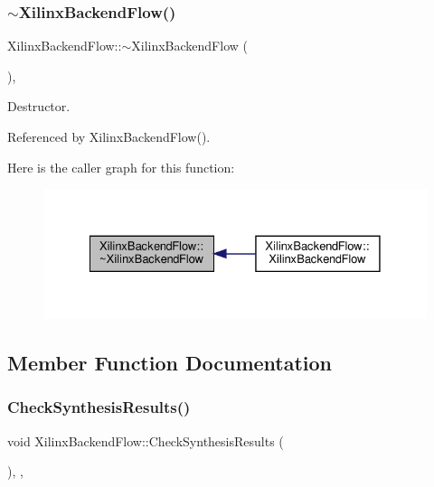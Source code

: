 \subsubsection{\texorpdfstring{$\sim$\+Xilinx\+Backend\+Flow()}{~XilinxBackendFlow()}}
{\footnotesize\ttfamily Xilinx\+Backend\+Flow\+::$\sim$\+Xilinx\+Backend\+Flow (\begin{DoxyParamCaption}{ }\end{DoxyParamCaption})\hspace{0.3cm}{\ttfamily [override]}, {\ttfamily [default]}}



Destructor. 



Referenced by Xilinx\+Backend\+Flow().

Here is the caller graph for this function\+:
\nopagebreak
\begin{figure}[H]
\begin{center}
\leavevmode
\includegraphics[width=328pt]{d6/d94/classXilinxBackendFlow_ab9993332094e8d1090c00ba110fe82e1_icgraph}
\end{center}
\end{figure}


\subsection{Member Function Documentation}
\mbox{\label{classXilinxBackendFlow_a4c059a8e048f5780fa09f00ff7faf817}} 
\subsubsection{\texorpdfstring{Check\+Synthesis\+Results()}{CheckSynthesisResults()}}
{\footnotesize\ttfamily void Xilinx\+Backend\+Flow\+::\+Check\+Synthesis\+Results (\begin{DoxyParamCaption}{ }\end{DoxyParamCaption})\hspace{0.3cm}{\ttfamily [override]}, {\ttfamily [protected]}, {\ttfamily [virtual]}}



